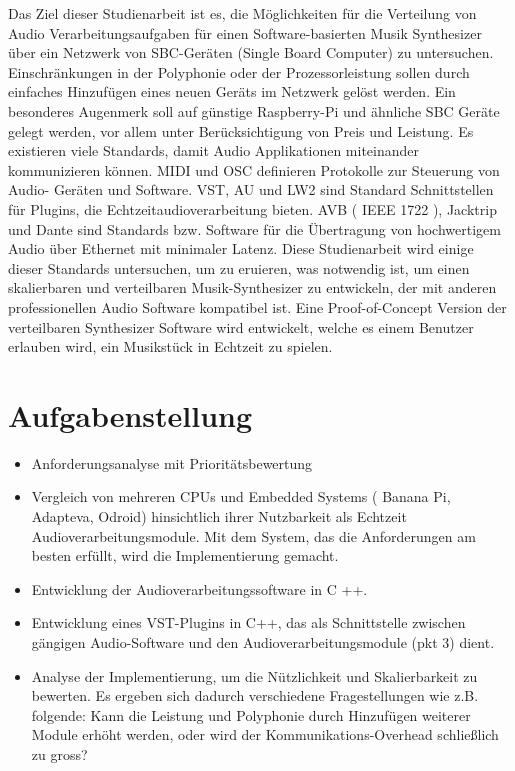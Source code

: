 Das Ziel dieser Studienarbeit ist es, die Möglichkeiten für die Verteilung von Audio Verarbeitungsaufgaben für einen Software-basierten Musik Synthesizer über ein Netzwerk von SBC-Geräten (Single Board Computer) zu untersuchen. Einschränkungen in der Polyphonie oder der Prozessorleistung sollen durch einfaches Hinzufügen eines neuen Geräts im Netzwerk gelöst werden. Ein besonderes Augenmerk soll auf günstige Raspberry-Pi und ähnliche SBC Geräte gelegt werden, vor allem unter Berücksichtigung von Preis und Leistung.
Es existieren viele Standards, damit Audio Applikationen miteinander kommunizieren können. MIDI und OSC definieren Protokolle zur Steuerung von Audio- Geräten und Software. VST, AU und LW2 sind Standard Schnittstellen für Plugins, die Echtzeitaudioverarbeitung bieten. AVB ( IEEE 1722 ), Jacktrip und Dante sind Standards bzw. Software für die Übertragung von hochwertigem Audio über Ethernet mit minimaler Latenz. Diese Studienarbeit wird einige dieser Standards untersuchen, um zu eruieren, was notwendig ist, um einen skalierbaren und verteilbaren Musik-Synthesizer zu entwickeln, der mit anderen professionellen Audio Software kompatibel ist.
Eine Proof-of-Concept Version der verteilbaren Synthesizer Software wird entwickelt, welche es einem Benutzer erlauben wird, ein Musikstück in Echtzeit zu spielen.

\section{Aufgabenstellung}

\begin{itemize}

\item Anforderungsanalyse mit Prioritätsbewertung

\item Vergleich von mehreren CPUs und Embedded Systems ( Banana Pi, Adapteva, Odroid) hinsichtlich ihrer Nutzbarkeit als Echtzeit Audioverarbeitungsmodule. Mit dem System, das die Anforderungen am besten erfüllt, wird die Implementierung gemacht.

\item Entwicklung der Audioverarbeitungssoftware in C ++.

\item Entwicklung eines VST-Plugins in C++, das als Schnittstelle zwischen gängigen Audio-Software und den Audioverarbeitungsmodule (pkt 3) dient.

\item Analyse der Implementierung, um die Nützlichkeit und Skalierbarkeit zu bewerten. Es ergeben sich dadurch verschiedene Fragestellungen wie z.B. folgende: Kann die Leistung und Polyphonie durch Hinzufügen weiterer Module erhöht werden, oder wird der Kommunikations-Overhead schließlich zu gross?

\end{itemize}


